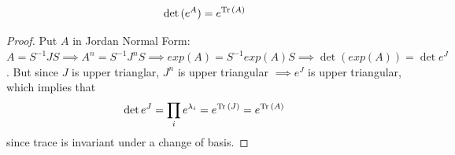     \begin{proposition}
      \begin{equation}
        \det{(e^A)} = e^{\operatorname{Tr}{(A)}}
      \end{equation}
    \end{proposition}
    \begin{proof}
      Put $A$ in Jordan Normal Form: $A = S^{-1} J S \implies A^n = S^{-1} J^n S \implies exp(A) = S^{-1} exp(A) S \implies \det{(exp(A))} = \det{e^J}$. But since $J$ is upper trianglar, $J^n$ is upper triangular $\implies e^J$ is upper triangular, which implies that 
      \begin{equation}
        \det{e^J} = \prod_i e^{\lambda_i} = e^{\operatorname{Tr}{(J)}} = e^{\operatorname{Tr}{(A)}}
      \end{equation}
      since trace is invariant under a change of basis. 
    \end{proof}


